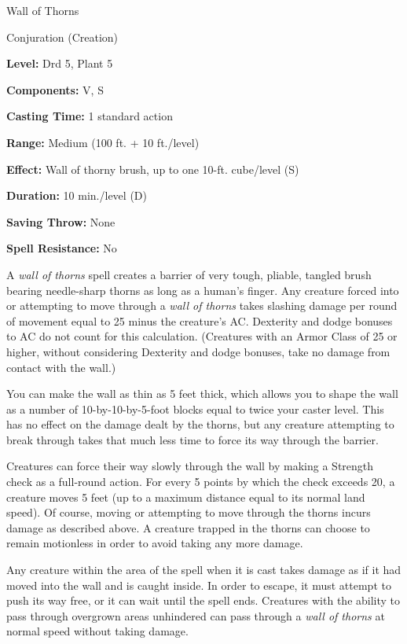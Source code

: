 \documentclass{article}
\begin{document}
\vspace{12pt}
Wall of Thorns

Conjuration (Creation)

\textbf{Level:} Drd 5, Plant 5

\textbf{Components:} V, S

\textbf{Casting Time:} 1 standard action

\textbf{Range: }Medium (100 ft. + 10 ft./level)

\textbf{Effect: }Wall of thorny brush, up to one 10-ft. cube/level (S)

\textbf{Duration:} 10 min./level (D)

\textbf{Saving Throw:} None

\textbf{Spell Resistance:} No

A \textit{wall of thorns }spell creates a barrier of very tough, pliable, tangled 
brush bearing needle-sharp thorns as long as a human's finger. Any creature forced 
into or attempting to move through a \textit{wall of thorns }takes slashing damage 
per round of movement equal to 25 minus the creature's AC. Dexterity and dodge 
bonuses to AC do not count for this calculation. (Creatures with an Armor Class 
of 25 or higher, without considering Dexterity and dodge bonuses, take no damage 
from contact with the wall.)

You can make the wall as thin as 5 feet thick, which allows you to shape the wall 
as a number of 10-by-10-by-5-foot blocks equal to twice your caster level. This 
has no effect on the damage dealt by the thorns, but any creature attempting to 
break through takes that much less time to force its way through the barrier.

Creatures can force their way slowly through the wall by making a Strength check 
as a full-round action. For every 5 points by which the check exceeds 20, a creature 
moves 5 feet (up to a maximum distance equal to its normal land speed). Of course, 
moving or attempting to move through the thorns incurs damage as described above. 
A creature trapped in the thorns can choose to remain motionless in order to avoid 
taking any more damage.

Any creature within the area of the spell when it is cast takes damage as if it 
had moved into the wall and is caught inside. In order to escape, it must attempt 
to push its way free, or it can wait until the spell ends. Creatures with the ability 
to pass through overgrown areas unhindered can pass through a \textit{wall of thorns 
}at normal speed without taking damage.
\end{document}
